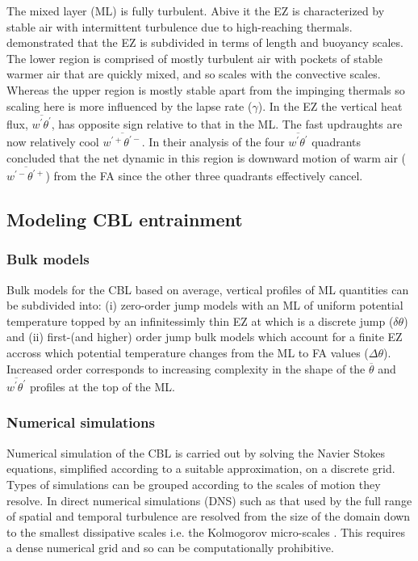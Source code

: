 The mixed layer (ML) is fully turbulent.  Abive it the EZ is characterized by stable air with intermittent turbulence due to high-reaching thermals. \cite{GarciaMellado} demonstrated that the EZ is subdivided in terms of length and buoyancy scales.  The lower region is comprised of mostly turbulent air with pockets of stable warmer air that are quickly mixed, and so scales with the convective scales. Whereas the upper region is mostly stable apart from the impinging thermals so scaling here is more influenced by the lapse rate ($\gamma$).  In the EZ the vertical heat flux, $\overline{w^{'}\theta^{'}}$, has opposite sign relative to that in the ML.  The fast updraughts are now relatively cool $\overline{w^{'+}\theta^{'-}}$.  In their analysis of the four $\overline{w^{'}\theta^{'}}$ quadrants \cite{SullMoengStev} concluded that the net dynamic in this region is downward motion of warm air ($\overline{w^{'-}\theta^{'+}}$) from the FA since the other three quadrants effectively cancel.\\

\subsection{Modeling CBL entrainment}

\subsubsection{Bulk models}
\label{subsubsec:bulkmod}

Bulk  models for the CBL based on average, vertical profiles of ML quantities can be subdivided into: (i) zero-order jump models with an ML of uniform potential temperature topped by an infinitessimly thin EZ at which is a discrete jump ($\delta \theta$) and (ii) first-(and higher) order jump bulk models which account for a finite EZ accross which potential temperature changes from the ML to FA values ($\Delta \theta$).  Increased order corresponds to increasing complexity in the shape of the  $\overline{\theta}$ and $\overline{w^{'}\theta^{'}}$ profiles at the top of the ML. \citep{Tennekes73, Betts74, BatchGryn, Stull73, Deardorff79, FedConzMir04}\\ 

\subsubsection{Numerical simulations}
\label{subsec:numsim}

Numerical simulation of the CBL is carried out by solving the Navier Stokes equations, simplified according to a suitable approximation, on a discrete grid.  Types of simulations can be grouped according to the scales of motion they resolve.  In direct numerical simulations (DNS) such as that used by \cite{GarciaMellado} the full range of spatial and temporal turbulence are resolved from the size of the domain down to the smallest dissipative scales i.e. the Kolmogorov micro-scales \citep{Kolmog}.  This requires a dense numerical grid and so can be computationally prohibitive.\\

